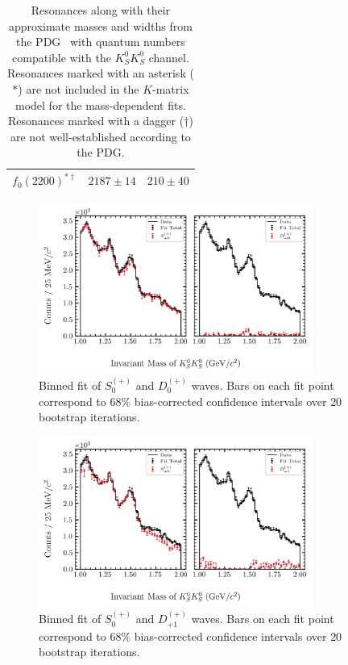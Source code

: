 \begin{table}
\begin{center}
\begin{tabular}{ccc}
      $f_0(2200)^{\ast\dagger}$ & $2187\pm 14$ & $210\pm 40$ \\\bottomrule
    \end{tabular}
    \caption{Resonances along with their approximate masses and widths from the PDG~\cite{Zyla2020} with quantum numbers compatible with the $K_S^0K_S^0$ channel. Resonances marked with an asterisk ($\ast$) are not included in the $K$-matrix model for the mass-dependent fits. Resonances marked with a dagger ($\dagger$) are not well-established according to the PDG.}\label{tab:pdg-resonances}
  \end{center}
\end{table}


\begin{figure}
  \begin{center}
    \includegraphics[width=0.8\textwidth]{figures/binned_fit_chisqdof_3.4_splot_D_1s_2b_phase_factor_waves487_uncertainty_bootstrap-CI-BC.png}
  \end{center}
  \caption{Binned fit of $S_{0}^{(+)}$ and $D_{0}^{(+)}$ waves. Bars on each fit point correspond to $68\%$ bias-corrected confidence intervals over $20$ bootstrap iterations.}\label{fig:binned-fit-chisqdof-3.4-Sp-D0p}
\end{figure}
\begin{figure}
  \begin{center}
    \includegraphics[width=0.8\textwidth]{figures/binned_fit_chisqdof_3.4_splot_D_1s_2b_phase_factor_waves489_uncertainty_bootstrap-CI-BC.png}
  \end{center}
  \caption{Binned fit of $S_{0}^{(+)}$ and $D_{+1}^{(+)}$ waves. Bars on each fit point correspond to $68\%$ bias-corrected confidence intervals over $20$ bootstrap iterations.}\label{fig:binned-fit-chisqdof-3.4-Sp-D1p}
\end{figure}
